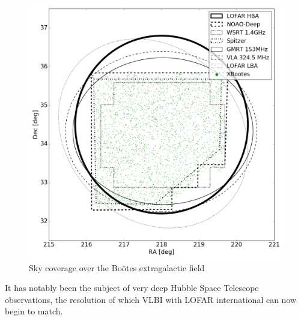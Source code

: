 \begin{figure}[h!]
\includegraphics[width=\linewidth]{images/SkyCoverageMap}
\caption{Sky coverage over the Boötes extragalactic field}
\label{bootes-coverage-image}
\end{figure}

It has notably been the subject of very deep Hubble Space Telescope observations, the resolution of which VLBI with LOFAR international can now begin to match.

%
%
%
